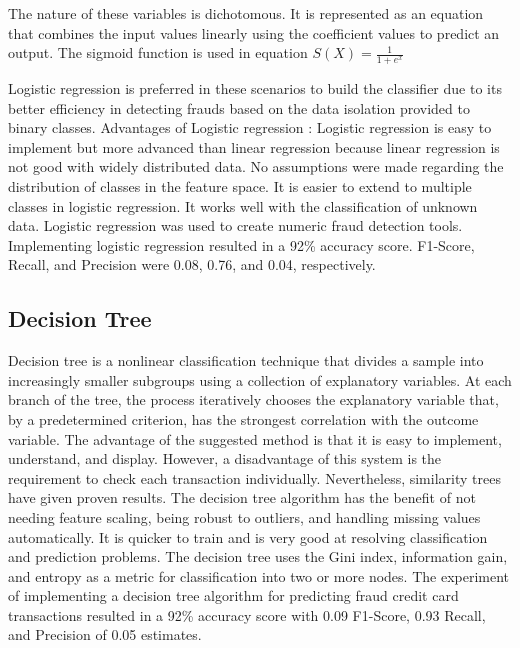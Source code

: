 \documentclass[a4paper,twocolumn,12pt]{article}
\begin{document}
The nature of these variables is dichotomous. It is represented as an equation that combines the input values linearly using the coefficient values to predict an output. The sigmoid function is used in equation\cite{9913607}  \(S(X) = \frac{1}{1+e^x}\)

Logistic regression is preferred in these scenarios to build the classifier due to its better efficiency in detecting frauds based on the data isolation provided to binary classes.\cite{9913607}
Advantages of Logistic regression :
Logistic regression is easy to implement but more advanced than linear regression because linear regression is not good with widely distributed data. 
No assumptions were made regarding the distribution of classes in the feature space.
It is easier to extend to multiple classes in logistic regression.
It works well with the classification of unknown data.\cite{9913607}
Logistic regression was used to create numeric fraud detection tools. Implementing logistic regression resulted in a 92\% accuracy score. F1-Score, Recall, and Precision were 0.08, 0.76, and 0.04, respectively.

\subsection{Decision Tree}

Decision tree is a nonlinear classification technique that divides a sample into increasingly smaller subgroups using a collection of explanatory variables. At each branch of the tree, the process iteratively chooses the explanatory variable that, by a predetermined criterion, has the strongest correlation with the outcome variable.\cite{afriyie2023supervised} The advantage of the suggested method is that it is easy to implement, understand, and display. However, a disadvantage of this system is the requirement to check each transaction individually. Nevertheless, similarity trees have given proven results.\cite{fan2004using} The decision tree algorithm has the benefit of not needing feature scaling, being robust to outliers, and handling missing values automatically. It is quicker to train and is very good at resolving classification and prediction problems. The decision tree uses the Gini index, information gain, and entropy as a metric for classification into two or more nodes.\cite{afriyie2023supervised} The experiment of implementing a decision tree algorithm for predicting fraud credit card transactions resulted in a 92\% accuracy score with 0.09 F1-Score, 0.93 Recall, and Precision of 0.05 estimates.
\end{document}
